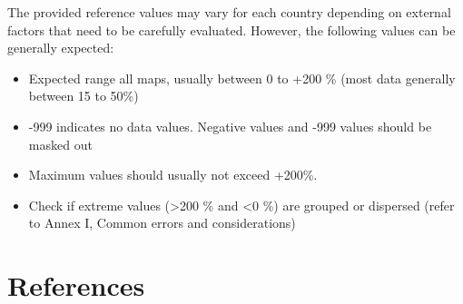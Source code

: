 \documentclass[
  10pt,
  b5paper,
]{book}
\providecommand{\tightlist}{%
  \setlength{\itemsep}{0pt}\setlength{\parskip}{0pt}}
\begin{document}
The provided reference values may vary for each country depending on external factors that need to be carefully evaluated. However, the following values can be generally expected:

\begin{itemize}
\tightlist
\item
  Expected range all maps, usually between 0 to +200 \% (most data generally between 15 to 50\%)
\item
  -999 indicates no data values. Negative values and -999 values should be masked out
\item
  Maximum values should usually not exceed +200\%.
\item
  Check if extreme values (\textgreater200 \% and \textless0 \%) are grouped or dispersed (refer to Annex I, Common errors and considerations)
\end{itemize}

\hypertarget{references}{%
\chapter{References}\label{references}}

  
\end{document}
